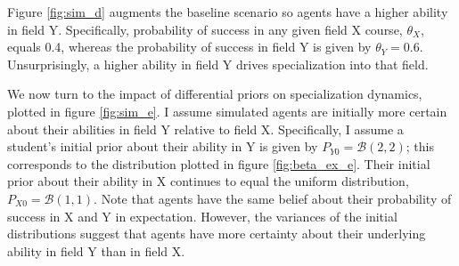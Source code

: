 


Figure \ref{fig:sim_d} augments the baseline scenario so agents have a higher ability in field Y. 
Specifically, probability of success in any given field X course, $\theta_X$, equals 0.4, whereas the probability of success in field Y is given by $\theta_Y = 0.6$. 
Unsurprisingly, a higher ability in field Y drives specialization into that field.

We now turn to the impact of differential priors on specialization dynamics, plotted in figure \ref{fig:sim_e}.
I assume simulated agents are initially more certain about their abilities in field Y relative to field X.
Specifically, I assume a student's initial prior about their ability in Y is given by $P_{Y0} = \mathcal{B} (2, 2)$; this corresponds to the distribution plotted in figure \ref{fig:beta_ex_e}.
Their initial prior about their ability in X continues to equal the uniform distribution, $P_{X0} = \mathcal{B} (1, 1)$.
Note that agents have the same belief about their probability of success in X and Y in expectation. 
However, the variances of the initial distributions suggest that agents have more certainty about their underlying ability in field Y than in field X.

